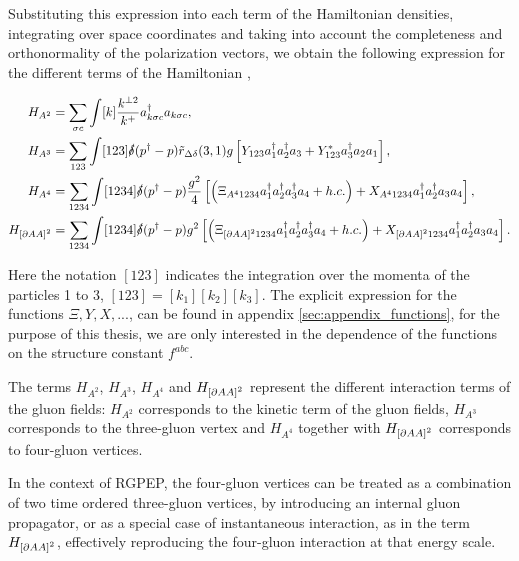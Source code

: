 \documentclass[11pt,a4paper,twoside,pdf]{article}
\numberwithin{equation}{section}
\begin{document}
Substituting this expression into each term of the Hamiltonian densities, integrating
over space coordinates and taking into account the completeness and orthonormality 
of the polarization vectors, we obtain the following expression for the different
terms of the Hamiltonian \cite{QCDG}, 

\begin{align}
    H_{A^2} &= \sum_{\sigma c} \int [k] \frac{k^{\perp 2}}{k^+}a^\dagger_{k\sigma c}
    a_{k\sigma c}, \label{eq:H_A^2}\\
    H_{A^3} &= \sum_{123} \int [123] \slashed{\delta}(p^\dagger - p) \tilde{r}_{\Delta \delta}
    (3, 1) g\left[ Y_{123}a_1^\dagger a_2^\dagger a_3 + Y_{123}^*a_3^\dagger a_2 a_1 \right],
    \label{eq:H_A^3}\\
    H_{A^4} &= \sum_{1234} \int [1234] \slashed{\delta}(p^\dagger - p) \frac{g^2}{4}
    \left[ \left( \Xi_{A^4 1234} a_1^\dagger a_2^\dagger a_3^\dagger a_4 + h.c. \right)+ X_{A^4 1234} 
    a_1^\dagger a_2^\dagger a_3 a_4  \right], \label{eq:H_A^4}\\
    H_{\left[ \partial A A \right]^2} &= \sum_{1234} \int [1234] \slashed{\delta}
    (p^\dagger - p) g^2 \left[ \left( \Xi_{\left[ \partial A A \right]^2 1234}
    a_1^\dagger a_2^\dagger a_3^\dagger a_4 + h.c. \right) + X_{\left[ \partial A A \right]^2 
    1234} a_1^\dagger a_2^\dagger a_3 a_4  \right] \label{eq:H_partial}.
\end{align}

Here the notation $[123]$ indicates the integration over the momenta of
the particles 1 to 3, $[123] = [k_1][k_2][k_3]$. The explicit expression for the 
functions $\Xi, Y, X, ...$, can be found in appendix \ref{sec:appendix_functions}, for 
the purpose of this thesis, we are only interested in the dependence of the functions 
on the structure constant $f^{abc}$. 

The terms $H_{A^2}$, $H_{A^3}$, $H_{A^4}$ and $H_{\left[ \partial A A \right]^2}$
represent the different interaction terms of the gluon fields: $H_{A^2}$ corresponds to 
the kinetic term of the gluon fields, $H_{A^3}$ corresponds to the three-gluon
vertex and  $H_{A^4}$ together with $H_{\left[ \partial A A \right]^2}$ corresponds to
four-gluon vertices. 

In the context of RGPEP, the four-gluon vertices can be treated as a combination of two
time ordered
three-gluon vertices, by introducing an internal gluon propagator, or as a
special case of instantaneous interaction, as in the term $H_{\left[ \partial A A \right]^2}$, 
effectively reproducing the four-gluon interaction at that energy scale. 
\end{document}
